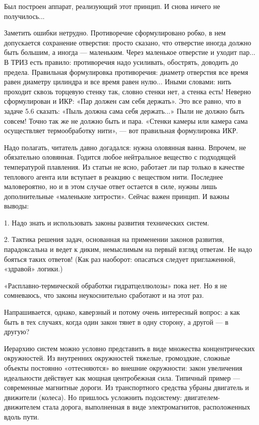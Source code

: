 Был  построен аппарат,  реализующий этот  принцип. И  снова ничего  не
получилось...

Заметить  ошибки нетрудно.  Противоречие сформулировано  робко, в  нем
допускается сохранение отверстия: просто сказано, что отверстие иногда
должно быть большим, а иногда — маленьким. Через маленькое отверстие и
уходит  пар...  В  ТРИЗ  есть правило:  противоречия  надо  усиливать,
обострять, доводить до  предела. Правильная формулировка противоречия:
диаметр отверстия все время равен  диаметру цилиндра и все время равен
нулю...  Иными  словами: нить  проходит  сквозь  торцевую стенку  так,
словно стенки  нет, а стенка  есть! Неверно сформулирован и  ИКР: «Пар
должен сам  себя держать». Это  все равно,  что в задаче  5.6 сказать:
«Пыль должна сама  себя держать...» Пыли не должно  быть совсем! Точно
так  же  не  должно  быть  и пара.  «Стенки  камеры  или  камера  сама
осуществляет термообработку нити», — вот правильная формулировка ИКР.

Надо  полагать,  читатель  давно  догадался:  нужна  оловянная  ванна.
Впрочем, не обязательно оловянная.  Годится любое нейтральное вещество
с подходящей  температурой плавления. Из  статьи не ясно,  работает ли
пар  только в  качестве  теплового  агента или  вступает  в реакцию  с
веществом  нити. Последнее  маловероятно,  но и  в  этом случае  ответ
остается  в  силе,  нужны лишь  дополнительные  «маленькие  хитрости».
Сейчас важен принцип. И важны выводы:

1. Надо знать и использовать законы развития технических систем.

2. Тактика  решения задач, основанная на  применении законов развития,
парадоксальна и ведет к диким, немыслимым на первый взгляд ответам. Не
надо  бояться  таких ответов!  (Как  раз  наоборот: опасаться  следует
приглаженной, «здравой» логики.)


«Расплавно-термической обработки  гидратцеллюлозы» пока  нет. Но  я не
сомневаюсь, что законы неукоснительно сработают и на этот раз.





Напрашивается, однако,  каверзный и потому очень  интересный вопрос: а
как  быть в  тех случаях,  когда один  закон тянет  в одну  сторону, а
другой — в другую?

Иерархию   систем  можно   условно   представить   в  виде   множества
концентрических  окружностей.   Из  внутренних   окружностей  тяжелые,
громоздкие,  сложные   объекты  постоянно  «оттесняются»   во  внешние
окружности:   закон  увеличения   идеальности  действует   как  мощная
центробежная сила. Типичный пример  — современные магнитные дороги. Из
транспортного  средства  убраны  двигатель и  движители  (колеса).  Но
пришлось  усложнить  подсистему: двигателем-движителем  стала  дорога,
выполненная в виде электромагнитов, расположенных вдоль пути.


